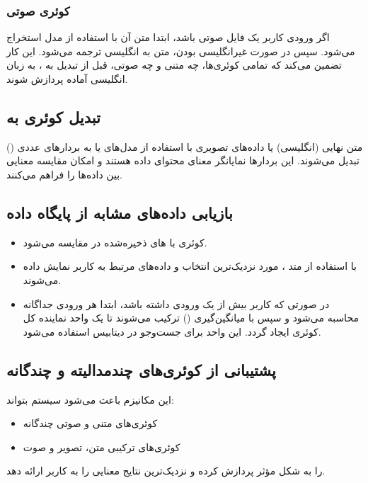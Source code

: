 \documentclass{article}
\begin{document}
\subsubsection{کوئری صوتی}
اگر ورودی کاربر یک فایل صوتی باشد، ابتدا متن آن با استفاده از مدل  استخراج می‌شود.
سپس در صورت غیرانگلیسی بودن، متن به انگلیسی ترجمه می‌شود.
این کار تضمین می‌کند که تمامی کوئری‌ها، چه متنی و چه صوتی، قبل از تبدیل به ، به زبان انگلیسی آماده پردازش شوند.

\subsection{تبدیل کوئری به }
متن نهایی (انگلیسی) یا داده‌های تصویری با استفاده از مدل‌های  یا  به بردارهای عددی () تبدیل می‌شوند.
این بردارها نمایانگر معنای محتوای داده هستند و امکان مقایسه معنایی بین داده‌ها را فراهم می‌کنند.

\subsection{بازیابی داده‌های مشابه از پایگاه داده}

\begin{itemize}
\item {} کوئری با ‌های ذخیره‌شده در  مقایسه می‌شود.

\item با استفاده از متد ،  مورد نزدیک‌ترین  انتخاب و داده‌های مرتبط به کاربر نمایش داده می‌شوند.

\item در صورتی که کاربر بیش از یک ورودی داشته باشد، ابتدا  هر ورودی جداگانه محاسبه می‌شود و سپس با میانگین‌گیری () ترکیب می‌شوند تا یک  واحد نماینده کل کوئری ایجاد گردد.
این  واحد برای جست‌وجو در دیتابیس استفاده می‌شود.
\end{itemize}

\subsection{پشتیبانی از کوئری‌های چندمدالیته و چندگانه}

این مکانیزم باعث می‌شود سیستم بتواند:
\begin{itemize}
\item کوئری‌های متنی و صوتی چندگانه
\item کوئری‌های ترکیبی متن، تصویر و صوت
\end{itemize}
را به شکل مؤثر پردازش کرده و نزدیک‌ترین نتایج معنایی را به کاربر ارائه دهد.
\end{document}
